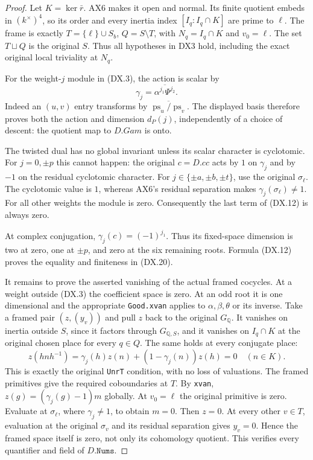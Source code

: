 \begin{proof}
Let $K=\ker\bar r$.  AX6 makes it open and normal.
Its finite quotient embeds in $(k^\times)^4$, so its order
and every inertia index $[I_q:I_q\cap K]$ are prime to $\ell$.
The frame is exactly $T=\{\ell\}\cup S_b$, $Q=S\setminus T$,
with $N_q=I_q\cap K$ and $v_0=\ell$.
The set $T\sqcup Q$ is the original $S$.
Thus all hypotheses in DX3 hold, including the exact original
local triviality at $N_q$.

For the weight-$j$ module in (DX.3), the action is scalar by
\[
       \gamma_j=\overline{\alpha^{j_1}\Psi^{j_2}}.
 \tag{DX.21}
\]
Indeed an $(u,v)$ entry transforms by
$\overline{\operatorname{ps}_u/\operatorname{ps}_v}$.
The displayed basis therefore proves both the action and
dimension $d_P(j)$, independently of a choice of descent:
the quotient map to $D.Gam$ is onto.

The twisted dual has no global invariant unless its scalar
character is cyclotomic.  For $j=0,\pm p$ this cannot happen:
the original $c=D.cc$ acts by $1$ on $\gamma_j$ and by $-1$
on the residual cyclotomic character.
For $j\in\{\pm a,\pm b,\pm t\}$, use the original
$\sigma_\ell$.  The cyclotomic value is $1$, whereas
AX6's residual separation makes $\gamma_j(\sigma_\ell)\ne1$.
For all other weights the module is zero.
Consequently the last term of (DX.12) is always zero.

At complex conjugation,
$\gamma_j(c)=(-1)^{j_1}$.
Thus its fixed-space dimension is two at zero, one at
$\pm p$, and zero at the six remaining roots.
Formula (DX.12) proves the equality and finiteness in (DX.20).

It remains to prove the asserted vanishing of the actual framed
cocycles.  At a weight outside (DX.3) the coefficient space
is zero.  At an odd root it is one dimensional and the
appropriate \texttt{Good.xvan} applies to
$\alpha,\beta,\theta$ or its inverse.
Take a framed pair $(z,(y_v))$ and pull $z$ back to the
original $G_{\mathbb Q}$.
It vanishes on inertia outside $S$, since it factors through
$G_{\mathbb Q,S}$, and it vanishes on $I_q\cap K$ at
the original chosen place for every $q\in Q$.
The same holds at every conjugate place:
\[
 z(hnh^{-1})=\gamma_j(h)z(n)
                           +(1-\gamma_j(n))z(h)=0
       \quad(n\in K).
 \tag{DX.22}
\]
This is exactly the original \texttt{UnrT} condition,
with no loss of valuations.
The framed primitives give the required coboundaries at $T$.
By \texttt{xvan}, $z(g)=(\gamma_j(g)-1)m$ globally.
At $v_0=\ell$ the original primitive is zero.
Evaluate at $\sigma_\ell$, where $\gamma_j\ne1$, to obtain
$m=0$.  Then $z=0$.
At every other $v\in T$, evaluation at the original
$\sigma_v$ and its residual separation gives $y_v=0$.
Hence the framed space itself is zero, not only its
cohomology quotient.  This verifies every quantifier and
field of $D.\texttt{Nums}$.
\end{proof}

